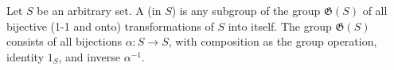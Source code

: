 Let $S$ be an arbitrary set. A  (in $S$) is any subgroup of the group $\mathfrak{G}(S)$ of all bijective (1-1 and onto) transformations of $S$ into itself. The group $\mathfrak{G}(S)$ consists of all bijections $\alpha : S \to S$, with composition as the group operation, identity $1_S$, and inverse $\alpha^{-1}$.

